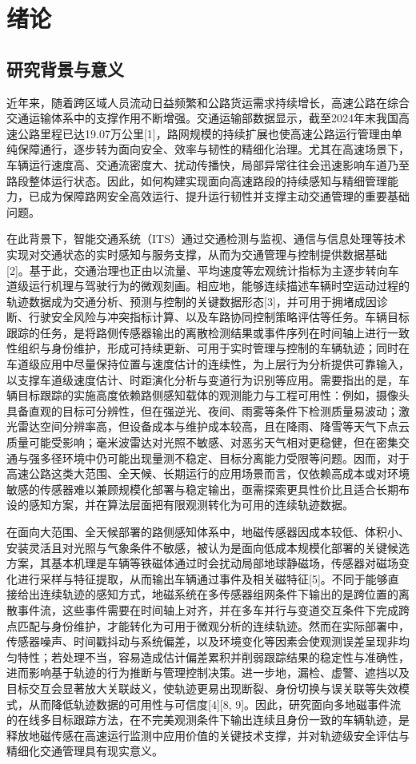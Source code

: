 \documentclass{xdupgthesis}
\begin{document}
\chapter{绪论}

\section{研究背景与意义}

近年来，随着跨区域人员流动日益频繁和公路货运需求持续增长，高速公路在综合交通运输体系中的支撑作用不断增强。交通运输部数据显示，截至2024年末我国高速公路里程已达19.07万公里[1]，路网规模的持续扩展也使高速公路运行管理由单纯保障通行，逐步转为面向安全、效率与韧性的精细化治理。尤其在高速场景下，车辆运行速度高、交通流密度大、扰动传播快，局部异常往往会迅速影响车道乃至路段整体运行状态。因此，如何构建实现面向高速路段的持续感知与精细管理能力，已成为保障路网安全高效运行、提升运行韧性并支撑主动交通管理的重要基础问题。

在此背景下，智能交通系统（ITS）通过交通检测与监视、通信与信息处理等技术实现对交通状态的实时感知与服务支撑，从而为交通管理与控制提供数据基础[2]。基于此，交通治理也正由以流量、平均速度等宏观统计指标为主逐步转向车道级运行机理与驾驶行为的微观刻画。相应地，能够连续描述车辆时空运动过程的轨迹数据成为交通分析、预测与控制的关键数据形态[3]，并可用于拥堵成因诊断、行驶安全风险与冲突指标计算、以及车路协同控制策略评估等任务。车辆目标跟踪的任务，是将路侧传感器输出的离散检测结果或事件序列在时间轴上进行一致性组织与身份维护，形成可持续更新、可用于实时管理与控制的车辆轨迹；同时在车道级应用中尽量保持位置与速度估计的连续性，为上层行为分析提供可靠输入，以支撑车道级速度估计、时距演化分析与变道行为识别等应用。需要指出的是，车辆目标跟踪的实施高度依赖路侧感知载体的观测能力与工程可用性：例如，摄像头具备直观的目标可分辨性，但在强逆光、夜间、雨雾等条件下检测质量易波动；激光雷达空间分辨率高，但设备成本与维护成本较高，且在降雨、降雪等天气下点云质量可能受影响；毫米波雷达对光照不敏感、对恶劣天气相对更稳健，但在密集交通与强多径环境中仍可能出现量测不稳定、目标分离能力受限等问题。因而，对于高速公路这类大范围、全天候、长期运行的应用场景而言，仅依赖高成本或对环境敏感的传感器难以兼顾规模化部署与稳定输出，亟需探索更具性价比且适合长期布设的感知方案，并在算法层面把有限观测转化为可用的连续轨迹数据。

在面向大范围、全天候部署的路侧感知体系中，地磁传感器因成本较低、体积小、安装灵活且对光照与气象条件不敏感，被认为是面向低成本规模化部署的关键候选方案，其基本机理是车辆等铁磁体通过时会扰动局部地球静磁场，传感器对磁场变化进行采样与特征提取，从而输出车辆通过事件及相关磁特征[5]。不同于能够直接给出连续轨迹的感知方式，地磁系统在多传感器组网条件下输出的是跨位置的离散事件流，这些事件需要在时间轴上对齐，并在多车并行与变道交互条件下完成跨点匹配与身份维护，才能转化为可用于微观分析的连续轨迹。然而在实际部署中，传感器噪声、时间戳抖动与系统偏差，以及环境变化等因素会使观测误差呈现非均匀特性；若处理不当，容易造成估计偏差累积并削弱跟踪结果的稳定性与准确性，进而影响基于轨迹的行为推断与管理控制决策。进一步地，漏检、虚警、遮挡以及目标交互会显著放大关联歧义，使轨迹更易出现断裂、身份切换与误关联等失效模式，从而降低轨迹数据的可用性与可信度[4][8, 9]。因此，研究面向多地磁事件流的在线多目标跟踪方法，在不完美观测条件下输出连续且身份一致的车辆轨迹，是释放地磁传感在高速运行监测中应用价值的关键技术支撑，并对轨迹级安全评估与精细化交通管理具有现实意义。
\end{document}
